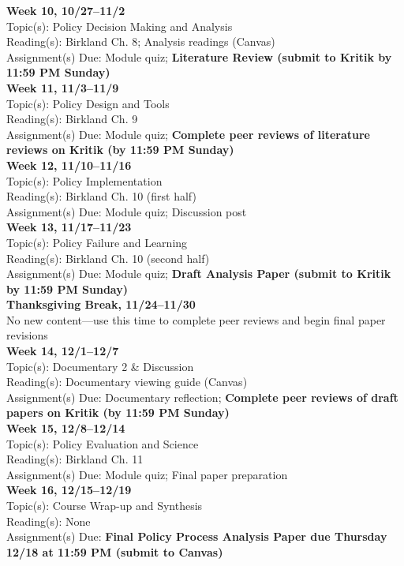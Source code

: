 \documentclass[12pt]{article}     %
\begin{document}
\noindent \textbf{Week 10, 10/27--11/2}\\
Topic(s): Policy Decision Making and Analysis\\
Reading(s): Birkland Ch. 8; Analysis readings (Canvas)\\
Assignment(s) Due: Module quiz; \textbf{Literature Review (submit to Kritik by 11:59 PM Sunday)}\\

\noindent \textbf{Week 11, 11/3--11/9}\\
Topic(s): Policy Design and Tools\\
Reading(s): Birkland Ch. 9\\
Assignment(s) Due: Module quiz; \textbf{Complete peer reviews of literature reviews on Kritik (by 11:59 PM Sunday)}\\

\noindent \textbf{Week 12, 11/10--11/16}\\
Topic(s): Policy Implementation\\
Reading(s): Birkland Ch. 10 (first half)\\
Assignment(s) Due: Module quiz; Discussion post\\

\noindent \textbf{Week 13, 11/17--11/23}\\
Topic(s): Policy Failure and Learning\\
Reading(s): Birkland Ch. 10 (second half)\\
Assignment(s) Due: Module quiz; \textbf{Draft Analysis Paper (submit to Kritik by 11:59 PM Sunday)}\\

\noindent \textbf{Thanksgiving Break, 11/24--11/30}\\
No new content---use this time to complete peer reviews and begin final paper revisions\\

\noindent \textbf{Week 14, 12/1--12/7}\\
Topic(s): Documentary 2 \& Discussion\\
Reading(s): Documentary viewing guide (Canvas)\\
Assignment(s) Due: Documentary reflection; \textbf{Complete peer reviews of draft papers on Kritik (by 11:59 PM Sunday)}\\

\noindent \textbf{Week 15, 12/8--12/14}\\
Topic(s): Policy Evaluation and Science\\
Reading(s): Birkland Ch. 11\\
Assignment(s) Due: Module quiz; Final paper preparation\\

\noindent \textbf{Week 16, 12/15--12/19}\\
Topic(s): Course Wrap-up and Synthesis\\
Reading(s): None\\
Assignment(s) Due: \textbf{Final Policy Process Analysis Paper due Thursday 12/18 at 11:59 PM (submit to Canvas)}\\
\end{document}
